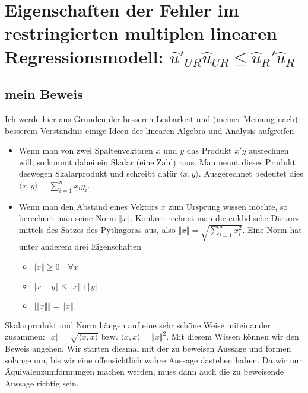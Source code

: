 \documentclass{article}
\begin{document}
	\section{Eigenschaften der Fehler im restringierten multiplen linearen Regressionsmodell: $\hat{u}'_{UR}\hat{u}_{UR} \le \hat{u}_R'\hat{u}_R$}
	\subsection{mein Beweis}
	Ich werde hier aus Gründen der besseren Lesbarkeit und (meiner Meinung nach) besserem Verständnis einige Ideen der linearen Algebra und Analysis aufgreifen
	\begin{itemize}
		\item Wenn man von zwei Spaltenvektoren $x$ und $y$ das Produkt $x'y$ ausrechnen will, so kommt dabei ein Skalar (eine Zahl) raus. Man nennt dieses Produkt deswegen Skalarprodukt und schreibt dafür $\langle x,y\rangle$. Ausgerechnet bedeutet dies $\langle x,y\rangle = \sum_{i=1}^{n} x_iy_i$.
		\item Wenn man den Abstand eines Vektors $x$ zum Ursprung wissen möchte, so berechnet man seine Norm $\Vert x\Vert$. Konkret rechnet man die euklidische Distanz mittels des Satzes des Pythagoras aus, also $\Vert x\Vert = \sqrt{\sum_{i=1}^n x_i^2}$. Eine Norm hat unter anderem drei Eigenschaften
		\begin{itemize}
			\item $\Vert x\Vert \ge 0 \quad\forall x$
			\item $\Vert x+y\Vert \le \Vert x\Vert + \Vert y\Vert$
			\item $\Vert\Vert x\Vert\Vert = \Vert x\Vert$
		\end{itemize}
	\end{itemize}
	Skalarprodukt und Norm hängen auf eine sehr schöne Weise miteinander zusammen: $\Vert x\Vert = \sqrt{\langle x,x\rangle}$ bzw. $\langle x,x\rangle = \Vert x\Vert^2$. Mit diesem Wissen können wir den Beweis angehen. Wir starten diesmal mit der zu beweisen Aussage und formen solange um, bis wir eine offensichtlich wahre Aussage dastehen haben. Da wir nur Äquivalenzumformungen machen werden, muss dann auch die zu beweisende Aussage richtig sein.
\end{document}
